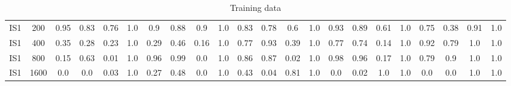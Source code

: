 \documentclass[10pt]{article}
\begin{document}
\begin{table}
\begin{tabular}{ cc||c c c c | c c c c | c c c c | c c c c| c c c c}
 					IS1 & 200 & 0.95 & 0.83 & 0.76 & 1.0 & 0.9 & 0.88 & 0.9 & 1.0& 0.83 & 0.78 & 0.6 & 1.0& 0.93 & 0.89 & 0.61 & 1.0 & 0.75 & 0.38 & 0.91 & 1.0\\ 
 					IS1 & 400 & 0.35 & 0.28 & 0.23 & 1.0 & 0.29 & 0.46 & 0.16 & 1.0& 0.77 & 0.93 & 0.39 & 1.0& 0.77 & 0.74 & 0.14 & 1.0 & 0.92 & 0.79 & 1.0 & 1.0\\ 
 					IS1 & 800 & 0.15 & 0.63 & 0.01 & 1.0 & 0.96 & 0.99 & 0.0 & 1.0& 0.86 & 0.87 & 0.02 & 1.0& 0.98 & 0.96 & 0.17 & 1.0 & 0.79 & 0.9 & 1.0 & 1.0\\ 
 					IS1 & 1600 & 0.0 & 0.0 & 0.03 & 1.0 & 0.27 & 0.48 & 0.0 & 1.0& 0.43 & 0.04 & 0.81 & 1.0& 0.0 & 0.02 & 1.0 & 1.0 & 0.0 & 0.0 & 1.0 & 1.0\\ \hline
 \hline
  \end{tabular}
  \caption{Training data}
\end{table}
\end{document}
